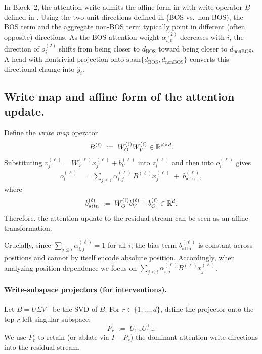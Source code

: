 \documentclass{article}
\theoremstyle{plain}
\theoremstyle{definition}
\theoremstyle{remark}
\begin{document}
In Block~2, the attention write admits the affine form in  with write operator $B$ defined in .
Using the two unit directions defined in  (BOS vs.\ non-BOS), the BOS term and the aggregate non-BOS term typically point in different (often opposite) directions.
As the BOS attention weight $\alpha^{(2)}_{i,0}$ decreases with $i$, the direction of $o_i^{(2)}$ shifts from being closer to $d_{\text{BOS}}$ toward being closer to $d_{\text{nonBOS}}$.
A head with nontrivial projection onto $\mathrm{span}\{d_{\text{BOS}},d_{\text{nonBOS}}\}$ converts this directional change into $\hat y_i$.

\subsection{Write map and affine form of the attention update.}
Define the \emph{write map} operator
\begin{equation}
B^{(\ell)} \;:=\; W_O^{(\ell)} W_V^{(\ell)} \in \mathbb{R}^{d\times d}.
\label{eq:def_B_ell}
\end{equation}
Substituting $v_j^{(\ell)} = W_V^{(\ell)}x_j^{(\ell)} + b_V^{(\ell)}$ into $z_i^{(\ell)}$ and then into $o_i^{(\ell)}$ gives
\begin{align}
o_i^{(\ell)}
&= \sum_{j\le i}\alpha_{i,j}^{(\ell)}\, B^{(\ell)} x_j^{(\ell)} \;+\; b_{\text{attn}}^{(\ell)},
\label{eq:attn_affine_ell}
\end{align}
where
\begin{equation}
b_{\text{attn}}^{(\ell)} \;:=\; W_O^{(\ell)} b_V^{(\ell)} + b_O^{(\ell)} \in \mathbb{R}^d.
\end{equation}
Therefore, the attention update to the residual stream can be seen as an affine transformation.

Crucially, since $\sum_{j\le i}\alpha_{i,j}^{(\ell)}=1$ for all $i$, the bias term $b_{\text{attn}}^{(\ell)}$ is constant across positions and cannot by itself encode absolute position.
Accordingly, when analyzing position dependence we focus on $\sum_{j\le i}\alpha_{i,j}^{(\ell)} B^{(\ell)} x_j^{(\ell)}$.

\paragraph{Write-subspace projectors (for interventions).}
Let $B = U\Sigma V^\top$ be the SVD of $B$.
For $r\in\{1,\dots,d\}$, define the projector onto the top-$r$ left-singular subspace:
\begin{equation}
P_r \;:=\; U_{1:r}U_{1:r}^\top.
\end{equation}
We use $P_r$ to retain (or ablate via $I-P_r$) the dominant attention write directions into the residual stream.
\end{document}
